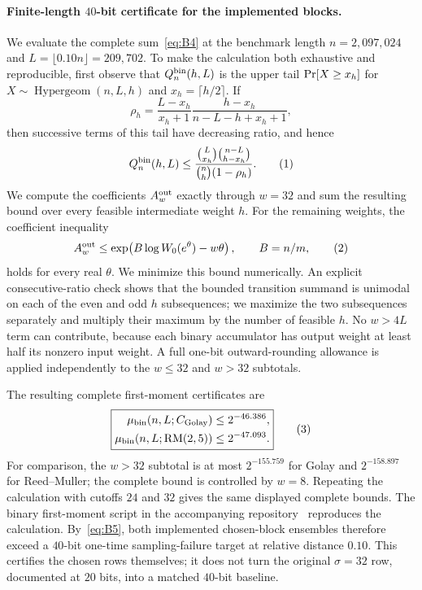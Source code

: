 \paragraph{Finite-length $40$-bit certificate for the implemented blocks.}
We evaluate the complete sum~\eqref{eq:B4} at the benchmark length
$n=2{,}097{,}024$ and $L=\lfloor0.10n\rfloor=209{,}702$.  To make the
calculation both exhaustive and reproducible, first observe that
$Q_n^{\rm bin}(h,L)$ is the upper tail
$\Pr[X\ge x_h]$ for
$X\sim\operatorname{Hypergeom}(n,L,h)$ and $x_h=\lceil h/2\rceil$.  If
\[
 \rho_h=
 \frac{L-x_h}{x_h+1}
 \frac{h-x_h}{n-L-h+x_h+1},
\]
then successive terms of this tail have decreasing ratio, and hence
\[
 Q_n^{\rm bin}(h,L)
 \le
 \frac{\binom{L}{x_h}\binom{n-L}{h-x_h}}
      {\binom{n}{h}(1-\rho_h)}.
 \eqnumlabel{eq:binary-hypergeom-tail}
\]
We compute the coefficients $A_w^{\rm out}$ exactly through $w=32$ and sum
the resulting bound over every feasible intermediate weight $h$.  For the
remaining weights, the coefficient inequality
\[
 A_w^{\rm out}
 \le
 \exp\!\left(B\log W_0(e^\theta)-w\theta\right),
 \qquad B=n/m,
 \eqnumlabel{eq:binary-coefficient-bound}
\]
 holds for every real $\theta$.  We minimize this bound numerically.  An
 explicit consecutive-ratio check shows that the bounded transition summand is
 unimodal on each of the even and odd $h$ subsequences; we maximize the two
 subsequences separately and multiply their maximum by the number of feasible
 $h$.  No $w>4L$ term can contribute, because each binary
accumulator has output weight at least half its nonzero input weight.  A full
one-bit outward-rounding allowance is applied independently to the $w\le32$
and $w>32$ subtotals.

The resulting complete first-moment certificates are
\[
 \boxed{
 \begin{aligned}
  \mu_{\rm bin}(n,L;C_{\rm Golay})
    &\le 2^{-46.386},\\
  \mu_{\rm bin}(n,L;\operatorname{RM}(2,5))
    &\le 2^{-47.093}.
 \end{aligned}}
 \eqnumlabel{eq:binary-40-certificate}
\]
For comparison, the $w>32$ subtotal is at most $2^{-155.759}$ for Golay and
$2^{-158.897}$ for Reed--Muller; the complete bound is controlled by $w=8$.
 Repeating the calculation with cutoffs $24$ and $32$ gives the same displayed
 complete bounds.  The binary first-moment script in the accompanying
 repository~\cite{chosenbaaartifact} reproduces the calculation.
 By~\eqref{eq:B5}, both implemented chosen-block ensembles
therefore exceed a $40$-bit one-time sampling-failure target at relative
distance $0.10$.  This certifies the chosen rows themselves; it does not turn
the original $\sigma=32$ row, documented at $20$ bits, into a matched $40$-bit
baseline.




